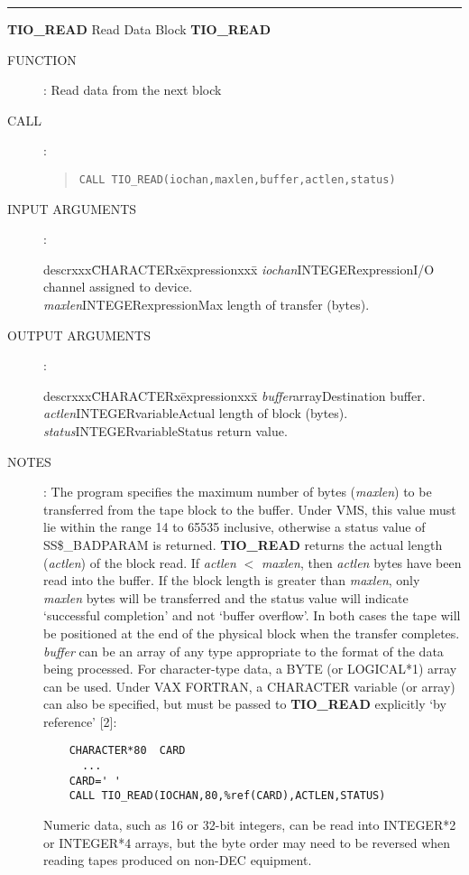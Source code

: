 \goodbreak
\rule{\textwidth}{0.3mm}
{\Large {\bf TIO\_READ} \hfill Read Data Block \hfill {\bf TIO\_READ}}
\begin{description}
\item [FUNCTION]:
Read data from the next block
\item [CALL]:
\begin{quote}
{\tt CALL TIO\_READ(iochan,maxlen,buffer,actlen,status)}
\end{quote}
\item [INPUT ARGUMENTS]:
\begin{tabbing}
descrxxx\=CHARACTERx\=expressionxxx\=\kill
{\em iochan}\>INTEGER\>expression\>I/O channel assigned to device.\\
{\em maxlen}\>INTEGER\>expression\>Max length of transfer (bytes).
\end{tabbing}
\item [OUTPUT ARGUMENTS]:
\begin{tabbing}
descrxxx\=CHARACTERx\=expressionxxx\=\kill
{\em buffer}\>\>array\>Destination buffer.\\
{\em actlen}\>INTEGER\>variable\>Actual length of block (bytes).\\
{\em status}\>INTEGER\>variable\>Status return value.
\end{tabbing}
\item [NOTES]:
The program specifies the maximum number of bytes ({\em maxlen}) to be
transferred from the tape block to the buffer.
Under VMS, this value must lie within the range 14 to 65535 inclusive, otherwise
a status value of SS\$\_BADPARAM is returned.
{\bf TIO\_READ} returns the actual length ({\em actlen}) of the block read.
If {\em actlen} $<$ {\em maxlen}, then {\em actlen} bytes have been read into
the buffer.
If the block length is greater than {\em maxlen}, only {\em maxlen} bytes will
be transferred and the status value will indicate `successful completion' and
not `buffer overflow'.
In both cases the tape will be positioned at the end of the physical block
when the transfer completes.
{\em buffer} can be an array of any type appropriate to the format of the data
being processed.
For character-type data, a BYTE (or LOGICAL*1) array can be used.
Under VAX FORTRAN, a CHARACTER variable (or array) can also be specified, but
must be passed to {\bf TIO\_READ} explicitly `by reference' [2]:
\begin{verbatim}
    CHARACTER*80  CARD
      ...
    CARD=' '
    CALL TIO_READ(IOCHAN,80,%ref(CARD),ACTLEN,STATUS)
\end{verbatim}
Numeric data, such as 16 or 32-bit integers, can be read into INTEGER*2 or
INTEGER*4 arrays, but the byte order may need to be reversed when reading tapes
produced on non-DEC equipment.
\end{description}
